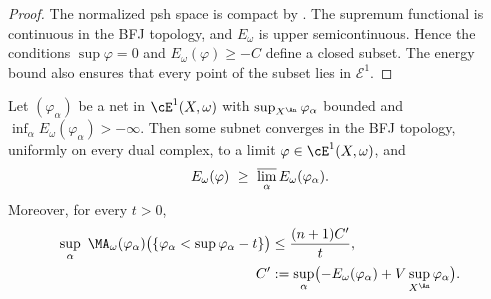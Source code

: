 \begin{proof}
The normalized psh space is compact by
. The supremum functional is continuous
in the BFJ topology, and $E_\omega$ is upper semicontinuous. Hence the
conditions $\sup\varphi=0$ and $E_\omega(\varphi)\geq-C$ define a closed
subset. The energy bound also ensures that every point of the subset lies in
$\mathcal E^1$.
\end{proof}

\begin{corollary}
\label{cor:ch26-net-superlevel}
Let $(\varphi_\alpha)$ be a net in $\cE^1(X,\omega)$ with
$\sup_{X^{\An}}\varphi_\alpha$ bounded and
$\inf_\alpha E_\omega(\varphi_\alpha)>-\infty$.  Then some subnet converges
in the BFJ topology, uniformly on every dual complex, to a limit
$\varphi\in\cE^1(X,\omega)$, and
\begin{equation}
\label{eq:ch26-net-energy-usc}
 E_\omega(\varphi)\ \geq\
 \varlimsup_\alpha E_\omega(\varphi_\alpha).
\end{equation}
Moreover, for every $t>0$,
\begin{equation}
\label{eq:ch26-uniform-tail-family}
 \begin{aligned}
 \sup_\alpha\ \MA_\omega(\varphi_\alpha)
   \bigl(\{\varphi_\alpha<\sup\varphi_\alpha-t\}\bigr)
 &\leq \frac{(n+1)C'}{t},\\
 C'&:=\sup_\alpha\bigl(-E_\omega(\varphi_\alpha)
   +V\sup_{X^{\An}}\varphi_\alpha\bigr).
 \end{aligned}
\end{equation}
\end{corollary}

